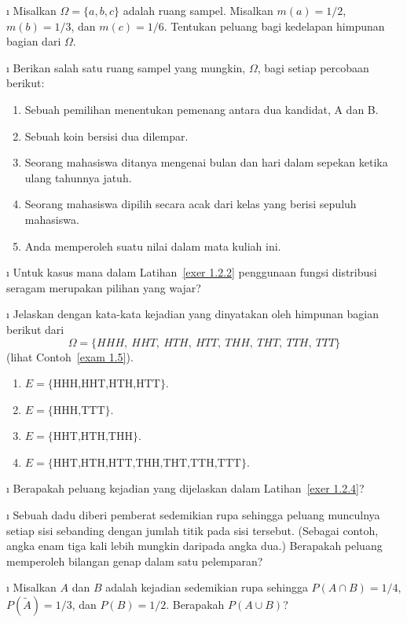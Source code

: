 \exercises
\begin{LJSItem}

\i\label{exer1.2.1} Misalkan $\Omega = \{a,b,c\}$ adalah ruang sampel.  Misalkan $m(a)
= 1/2$, $m(b) =
1/3$, dan $m(c) = 1/6$.  Tentukan peluang bagi kedelapan himpunan bagian dari
$\Omega$.

\i\label{exer 1.2.2} Berikan salah satu ruang sampel yang mungkin, $\Omega$, bagi setiap
percobaan berikut:
\begin{enumerate}
\item Sebuah pemilihan menentukan pemenang antara dua kandidat, A dan B.
\item Sebuah koin bersisi dua dilempar.
\item Seorang mahasiswa ditanya mengenai bulan dan hari dalam sepekan
ketika ulang tahunnya jatuh.
\item Seorang mahasiswa dipilih secara acak dari kelas yang berisi sepuluh mahasiswa.
\item Anda memperoleh suatu nilai dalam mata kuliah ini.
\end{enumerate}

\i\label{exer 1.2.3} Untuk kasus mana dalam Latihan~\ref{exer 1.2.2}  
penggunaan fungsi distribusi seragam merupakan pilihan yang wajar?

\i\label{exer 1.2.4} Jelaskan dengan kata-kata kejadian yang dinyatakan oleh
himpunan bagian berikut dari 
$$\Omega = \{HHH,\ HHT,\ HTH,\ HTT,\ THH,\ THT,\ TTH,\ TTT\}$$
(lihat Contoh~\ref{exam 1.5}).
\begin{enumerate}
\item $E = \{\mbox{HHH,HHT,HTH,HTT}\}$. 
\item $E = \{\mbox{HHH,TTT}\}$.
\item $E = \{\mbox{HHT,HTH,THH}\}$. 
\item $E =
\{\mbox{HHT,HTH,HTT,THH,THT,TTH,TTT}\}$.
\end{enumerate}

\i\label{exer 1.2.5} Berapakah peluang kejadian yang dijelaskan dalam
Latihan~\ref{exer 1.2.4}?

\i\label{exer 1.2.6} Sebuah dadu diberi pemberat sedemikian rupa sehingga peluang
munculnya setiap sisi
sebanding dengan jumlah titik pada sisi tersebut.  (Sebagai contoh, angka enam
tiga kali
lebih mungkin daripada angka dua.)  Berapakah peluang memperoleh bilangan
genap
dalam satu pelemparan?

\i\label{exer 1.2.7} Misalkan $A$ dan $B$ adalah kejadian sedemikian rupa sehingga $P(A \cap B) =
1/4$, $P(\tilde A) =
1/3$, dan $P(B) = 1/2$.  Berapakah $P(A \cup B)$?


\end{LJSItem}
